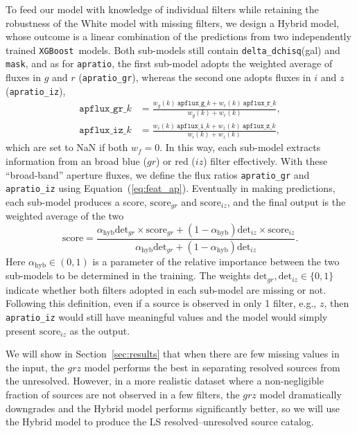 \documentclass[twocolumn]{aastex631}
\newcommand{\xgboost}{\texttt{XGBoost}}
\begin{document}
\begin{CJK*}{UTF8}{gbsn}
To feed our model with knowledge of individual filters while retaining the robustness of the White model with missing filters, we design a Hybrid model, whose outcome is a linear combination of the predictions from two independently trained \xgboost\ models. Both sub-models still contain \texttt{delta\_dchisq}(gal) and \texttt{mask}, and as for \texttt{apratio}, the first sub-model adopts the weighted average of fluxes in $g$ and $r$ (\texttt{apratio\_gr}), whereas the second one adopts fluxes in $i$ and $z$ (\texttt{apratio\_iz}),
\begin{equation}\label{eq:apflux_hybrid}
\begin{aligned}
    \texttt{apflux\_gr}\_k &= \frac{w_g(k) \ \texttt{apflux\_g}\_k + w_r(k) \ \texttt{apflux\_r}\_k}{w_g(k) + w_r(k)},\\
    \texttt{apflux\_iz}\_k &= \frac{w_i(k) \ \texttt{apflux\_i}\_k + w_z(k) \ \texttt{apflux\_z}\_k}{w_i(k) + w_z(k)},
\end{aligned}
\end{equation}
which are set to NaN if both $w_f=0$. In this way, each sub-model extracts information from an broad blue ($gr$) or red ($iz$) filter effectively. With these ``broad-band'' aperture fluxes, we define the flux ratios \texttt{apratio\_gr} and \texttt{apratio\_iz} using Equation~(\ref{eq:feat_ap}). Eventually in making predictions, each sub-model produces a score, $\mathrm{score}_{gr}$ and $\mathrm{score}_{iz}$, and the final output is the weighted average of the two
\begin{equation}\label{eq:score_hybrid}
    \mathrm{score} = \frac{\alpha_\mathrm{hyb}\mathrm{det}_{gr}\times\mathrm{score}_{gr} + (1 - \alpha_\mathrm{hyb})\mathrm{det}_{iz}\times\mathrm{score}_{iz}}{\alpha_\mathrm{hyb}\mathrm{det}_{gr} + (1 - \alpha_\mathrm{hyb})\mathrm{det}_{iz}}.
\end{equation}
Here $\alpha_\mathrm{hyb}\in(0,1)$ is a parameter of the relative importance between the two sub-models to be determined in the training. The weights $\mathrm{det}_{gr}, \mathrm{det}_{iz}\in\{0, 1\}$ indicate whether both filters adopted in each sub-model are missing or not. Following this definition, even if a source is observed in only 1 filter, e.g., $z$, then \texttt{apratio\_iz} would still have meaningful values and the model would simply present $\mathrm{score}_{iz}$ as the output.

We will show in Section~\ref{sec:results} that when there are few missing values in the input, the $grz$ model performs the best in separating resolved sources from the unresolved. However, in a more realistic dataset where a non-negligible fraction of sources are not observed in a few filters, the $grz$ model dramatically downgrades and the Hybrid model performs significantly better, so we will use the Hybrid model to produce the LS resolved--unresolved source catalog.


\end{CJK*}
\end{document}
